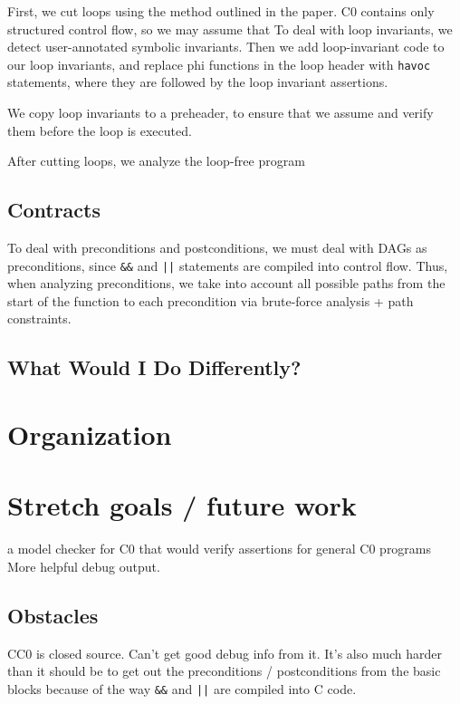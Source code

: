 \documentclass[12pt]{article}
\begin{document}
First, we cut loops using the method outlined in the paper. C0 contains only structured control flow, so we may assume that To deal with loop invariants, we detect user-annotated symbolic invariants. Then we add loop-invariant code to our loop invariants, and replace phi functions in the loop header with \texttt{havoc} statements, where they are followed by the loop invariant assertions.

We copy loop invariants to a preheader, to ensure that we assume and verify them before the loop is executed.

After cutting loops, we analyze the loop-free program
\subsection{Contracts}
To deal with preconditions and postconditions, we must deal with DAGs as preconditions, since \texttt{\&\&} and \texttt{||} statements are compiled into control flow. Thus, when analyzing preconditions, we take into account all possible paths from the start of the function to each precondition via brute-force analysis + path constraints.

\subsection{What Would I Do Differently?}

\section{Organization}

\section{Stretch goals / future work}
a model checker for C0 that would verify assertions for general C0 programs
More helpful debug output.

\subsection{Obstacles}
CC0 is closed source. Can't get good debug info from it. It's also much harder than it should be to get out the preconditions / postconditions from the basic blocks because of the way \texttt{\&\&} and \texttt{||} are compiled into C code.

\printbibliography
\end{document}
